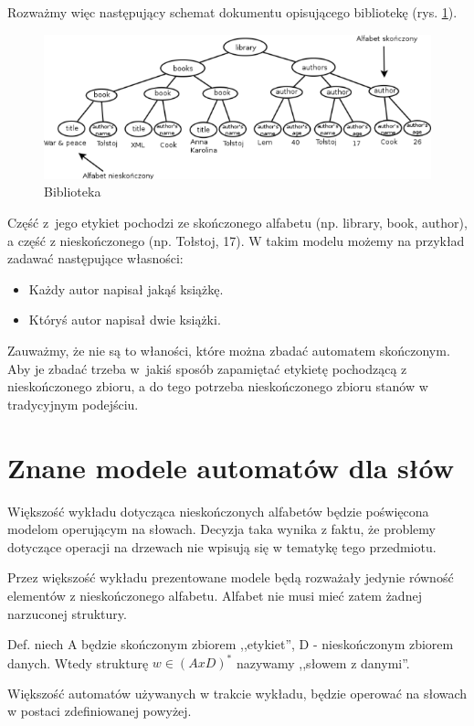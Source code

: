 \documentclass[a4paper,12pt]{report}
\begin{document}
Rozważmy więc następujący schemat dokumentu opisującego bibliotekę (rys. \ref{library}).
\begin{figure}
\begin{center}
\includegraphics{images/library.png}
\end{center}
\caption{Biblioteka}
\label{library}
\end{figure}

Część z~jego etykiet pochodzi ze skończonego alfabetu (np. library, book, author), a część z nieskończonego (np. Tołstoj, 17).
W takim modelu możemy na przykład zadawać następujące własności:
\begin{itemize}
\item Każdy autor napisał jakąś książkę.
\item Któryś autor napisał dwie książki.
\end{itemize}
Zauważmy, że nie są to właności, które można zbadać automatem skończonym. Aby je zbadać trzeba w~jakiś sposób zapamiętać etykietę pochodzącą z nieskończonego zbioru, a do tego potrzeba nieskończonego zbioru stanów w tradycyjnym podejściu.

\section {Znane modele automatów dla słów}

Większość wykładu dotycząca nieskończonych alfabetów będzie poświęcona modelom operującym na słowach. Decyzja taka wynika z faktu, że problemy dotyczące operacji na drzewach nie wpisują się w tematykę tego przedmiotu.

Przez większość wykładu prezentowane modele będą rozważały jedynie równość elementów z nieskończonego alfabetu. Alfabet nie musi mieć zatem żadnej narzuconej struktury.

Def. niech A będzie skończonym zbiorem ,,etykiet'', D - nieskończonym zbiorem danych. Wtedy strukturę $w \in (A x D)^*$ nazywamy ,,słowem z danymi''.

Większość automatów używanych w trakcie wykładu, będzie operować na słowach w postaci zdefiniowanej powyżej.
\end{document}
